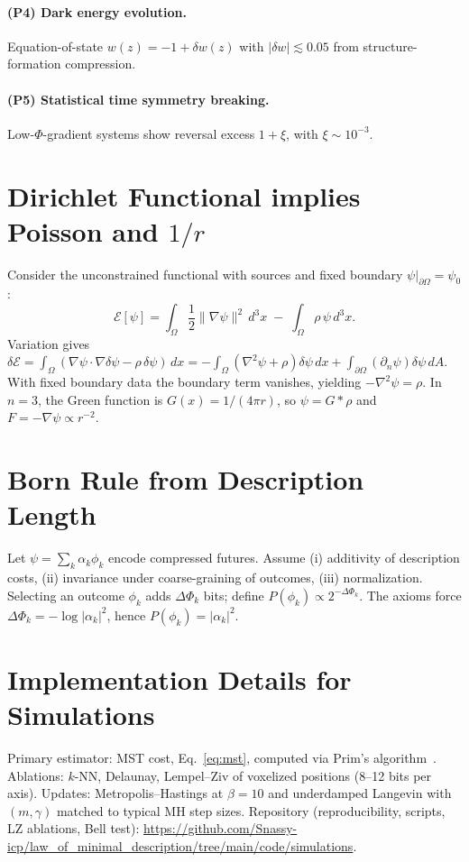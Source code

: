 \documentclass[aps,preprint,onecolumn,longbibliography,nofootinbib]{revtex4-2}
\numberwithin{equation}{section}        %
\begin{document}
\paragraph*{(P4) Dark energy evolution.}
Equation-of-state $w(z)=-1+\delta w(z)$ with $|\delta w|\lesssim 0.05$ from structure-formation compression.

\paragraph*{(P5) Statistical time symmetry breaking.}
Low-$\Phi$-gradient systems show reversal excess $1+\xi$, with $\xi\sim 10^{-3}$.

\appendix

\section{Dirichlet Functional implies Poisson and $1/r$}\label{app:A}
Consider the unconstrained functional with sources and fixed boundary $\psi|_{\partial\Omega}=\psi_0$:
\begin{equation}
\mathcal{E}[\psi]=\int_{\Omega} \frac{1}{2}\|\nabla\psi\|^2\,d^3x \;-\; \int_{\Omega}\rho\,\psi\,d^3x. \label{eq:A1}
\end{equation}
Variation gives $\delta\mathcal E=\int_\Omega (\nabla\psi\cdot\nabla\delta\psi - \rho\,\delta\psi)\,dx
= -\int_\Omega (\nabla^2\psi + \rho)\delta\psi\,dx + \int_{\partial\Omega} (\partial_n\psi)\delta\psi\,dA$.
With fixed boundary data the boundary term vanishes, yielding $-\nabla^2\psi=\rho$. In $n=3$, the Green function is $G(x)=1/(4\pi r)$, so $\psi=G\ast \rho$ and $F=-\nabla\psi\propto r^{-2}$.

\section{Born Rule from Description Length}\label{app:B}
Let $\psi=\sum_k \alpha_k \phi_k$ encode compressed futures. Assume (i) additivity of description costs, (ii) invariance under coarse-graining of outcomes, (iii) normalization. Selecting an outcome $\phi_k$ adds $\Delta\Phi_k$ bits; define $P(\phi_k)\propto 2^{-\Delta\Phi_k}$. The axioms force $\Delta\Phi_k=-\log|\alpha_k|^2$, hence $P(\phi_k)=|\alpha_k|^2$.

\section{Implementation Details for Simulations}\label{app:C}
Primary estimator: MST cost, Eq.~\eqref{eq:mst}, computed via Prim's algorithm~\cite{Prim1957}. Ablations: $k$-NN, Delaunay, Lempel--Ziv of voxelized positions (8--12 bits per axis). Updates: Metropolis--Hastings at $\beta=10$ and underdamped Langevin with $(m,\gamma)$ matched to typical MH step sizes. Repository (reproducibility, scripts, LZ ablations, Bell test): \url{https://github.com/Snassy-icp/law_of_minimal_description/tree/main/code/simulations}.
\end{document}
